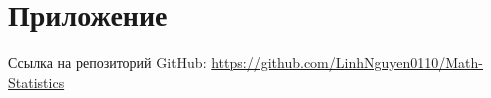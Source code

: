 \section{Приложение}

\noindent Ссылка на репозиторий GitHub: \url{https://github.com/LinhNguyen0110/Math-Statistics}